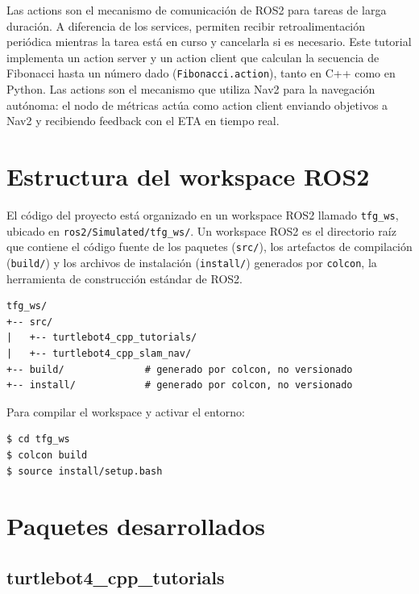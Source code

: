 Las actions son el mecanismo de comunicación de ROS2 para tareas de larga duración. A diferencia de los services, permiten recibir retroalimentación periódica mientras la tarea está en curso y cancelarla si es necesario. Este tutorial implementa un action server y un action client que calculan la secuencia de Fibonacci hasta un número dado (\texttt{Fibonacci.action}), tanto en C++ como en Python. Las actions son el mecanismo que utiliza Nav2 para la navegación autónoma: el nodo de métricas actúa como action client enviando objetivos a Nav2 y recibiendo feedback con el ETA en tiempo real.

\section{Estructura del workspace ROS2}

El código del proyecto está organizado en un workspace ROS2 llamado \texttt{tfg\_ws}, ubicado en \texttt{ros2/Simulated/tfg\_ws/}. Un workspace ROS2 es el directorio raíz que contiene el código fuente de los paquetes (\texttt{src/}), los artefactos de compilación (\texttt{build/}) y los archivos de instalación (\texttt{install/}) generados por \texttt{colcon}, la herramienta de construcción estándar de ROS2.

\vspace{1em}
\begin{minipage}{\linewidth}
\begin{verbatim}
tfg_ws/
+-- src/
|   +-- turtlebot4_cpp_tutorials/
|   +-- turtlebot4_cpp_slam_nav/
+-- build/              # generado por colcon, no versionado
+-- install/            # generado por colcon, no versionado
\end{verbatim}
\end{minipage}
\vspace{1em}

Para compilar el workspace y activar el entorno:

\begin{lstlisting}[language=bash, basicstyle=\ttfamily\small, backgroundcolor=\color{gray!15}, frame=single]
$ cd tfg_ws
$ colcon build
$ source install/setup.bash
\end{lstlisting}


\section{Paquetes desarrollados}

\subsection{turtlebot4\_cpp\_tutorials}


